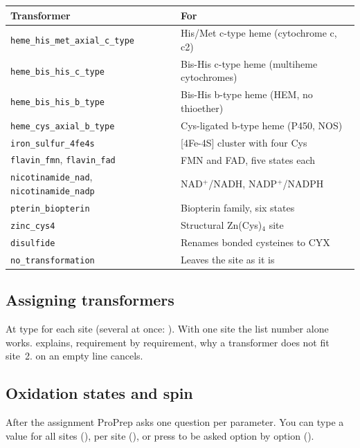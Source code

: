 \begin{tabularx}{\linewidth}{@{}lL@{}}
\toprule
\textbf{Transformer} & \textbf{For} \\
\midrule
\texttt{heme\_his\_met\_axial\_c\_type} & His/Met c-type heme (cytochrome c,
  c2) \\
\texttt{heme\_bis\_his\_c\_type} & Bis-His c-type heme (multiheme
  cytochromes) \\
\texttt{heme\_bis\_his\_b\_type} & Bis-His b-type heme (HEM, no thioether) \\
\texttt{heme\_cys\_axial\_b\_type} & Cys-ligated b-type heme (P450, NOS) \\
\texttt{iron\_sulfur\_4fe4s} & [4Fe-4S] cluster with four Cys \\
\texttt{flavin\_fmn}, \texttt{flavin\_fad} & FMN and FAD, five states
  each \\
\texttt{nicotinamide\_nad}, \texttt{nicotinamide\_nadp} & NAD$^+$/NADH,
  NADP$^+$/NADPH \\
\texttt{pterin\_biopterin} & Biopterin family, six states \\
\texttt{zinc\_cys4} & Structural Zn(Cys)$_4$ site \\
\texttt{disulfide} & Renames bonded cysteines to CYX \\
\texttt{no\_transformation} & Leaves the site as it is \\
\bottomrule
\end{tabularx}

\subsection{Assigning transformers}

At  type  for each site
(several at once: ). With one site the list
number alone works.  explains, requirement by requirement, why a
transformer does not fit site~2.  on an empty line cancels.

\subsection{Oxidation states and spin}

After the assignment ProPrep asks one question per parameter. You can type a
value for all sites (), per site (), or press  to be asked option by option
().

